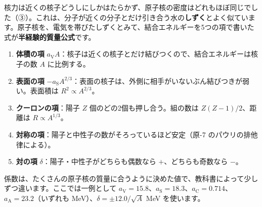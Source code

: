 核力は近くの核子どうしにしかはたらかず、原子核の密度はどれもほぼ同じでした（③）。これは、分子が近くの分子とだけ引き合う水の\textbf{しずく}とよく似ています。原子核を、電気を帯びたしずくとみて、結合エネルギーを5つの項で書いた式が\textbf{半経験的質量公式}です。
\label{ph:原-11:semf}
\begin{enumerate}[label={\bkcircled{\arabic*}}, leftmargin=2.4\zw, itemsep=1pt, topsep=2pt]
\item \textbf{体積の項} $a_{\mathrm V}A$：核子は近くの核子とだけ結びつくので、結合エネルギーは核子の数 $A$ に比例する。
\item \textbf{表面の項} $-a_{\mathrm S}A^{2/3}$：表面の核子は、外側に相手がいないぶん結びつきが弱い。表面積は $R^2\propto A^{2/3}$。
\item \textbf{クーロンの項}：陽子 $Z$ 個のどの2個も押し合う。組の数は $Z(Z-1)/2$、距離は $R\propto A^{1/3}$。
\item \textbf{対称の項}：陽子と中性子の数がそろっているほど安定（原-7 のパウリの排他律による）。
\item \textbf{対の項} $\delta$：陽子・中性子がどちらも偶数なら $+$、どちらも奇数なら $-$。
\end{enumerate}
係数は、たくさんの原子核の質量に合うように決めた値で、教科書によって少しずつ違います。ここでは一例として $a_{\mathrm V}=15.8$、$a_{\mathrm S}=18.3$、$a_{\mathrm C}=0.714$、$a_{\mathrm A}=23.2$（いずれも MeV）、$\delta=\pm12.0/\sqrt A$ MeV を使います。

